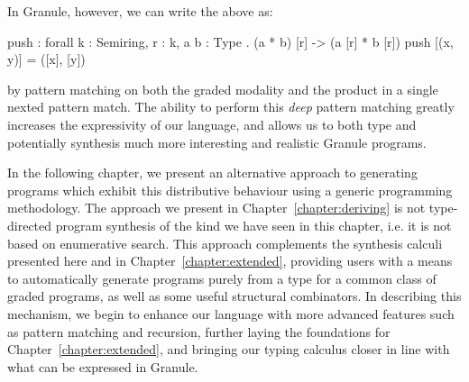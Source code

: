 In Granule, however, we can write the above as: 
\begin{granule}
push : forall {k : Semiring, r : k, a b : Type} 
     . (a * b) [r] -> (a [r] * b [r])
push [(x, y)] = ([x], [y])
\end{granule}
by pattern matching on both the graded modality and the product in a single
nexted pattern match. The ability to perform this \emph{deep} pattern matching
greatly increases the expressivity of our language, and allows us to both type
and potentially synthesis much more interesting and realistic Granule programs.

In the following chapter, we present an alternative approach to generating
programs which exhibit this distributive behaviour using a generic programming
methodology. The approach we present in Chapter~\ref{chapter:deriving} is not
type-directed program synthesis of the kind we have seen in this chapter, i.e.
it is not based on enumerative search. This approach complements the synthesis
calculi presented here and in Chapter~\ref{chapter:extended}, providing users
with a means to automatically generate programs purely from a type for a common
class of graded programs, as well as some useful structural combinators. In
describing this mechanism, we begin to enhance our language with more advanced
features such as pattern matching and recursion, further laying the foundations for
Chapter~\ref{chapter:extended}, and bringing our typing calculus closer in line
with what can be expressed in Granule.  


